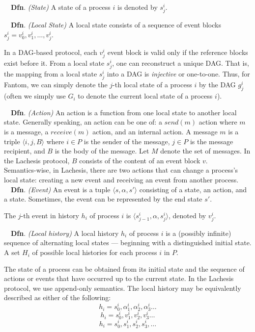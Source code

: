 \documentclass{article}
\newcommand{\dfnn}[2]{$\quad$\textbf{Dfn}. \emph{(#1)} {#2}}
\begin{document}
\dfnn{State}{A state of a process $i$ is denoted by $s_j^i$.}

\dfnn{Local State}{A local state consists of a sequence of event blocks $s_j^i = v_0^i, v_1^i, \dots, v_j^i$.}

 In a DAG-based protocol, each $v_j^i$ event block is valid only if the reference blocks exist before it. From a local state $s_j^i$, one can reconstruct a unique DAG. That is, the mapping from a local state  $s_j^i$ into a DAG is \emph{injective} or one-to-one. Thus, for Fantom, we can simply denote the $j$-th local state of a process $i$ by the DAG $g_j^i$ (often we simply use $G_i$ to denote the current local state of a process $i$).

\dfnn{Action}{An action is a function from one local state to another local state.}
 Generally speaking, an action can be one of: a $send(m)$ action where $m$ is a message, a $receive(m)$ action, and an internal action. A message $m$ is a triple $\langle i,j,B \rangle$ where $i \in P$ is the sender of the message, $j \in P$ is the message recipient, and $B$ is the body of the message. Let $M$ denote the set of messages. In the Lachesis protocol, $B$ consists of the content of an event block $v$.\\

Semantics-wise, in Lachesis, there are  two actions that can change a process's local state: creating a new event and receiving an event from another process.\\

\dfnn{Event}{An event is a tuple $\langle  s,\alpha,s' \rangle$ consisting of a state, an action, and a state. Sometimes, the event can be represented by the end state $s'$.}

The $j$-th event in history $h_i$ of process $i$ is $\langle  s_{j-1}^i,\alpha,s_j^i \rangle$, denoted by $v_j^i$.

\dfnn{Local history}{A local history $h_i$ of process $i$ is a (possibly infinite) sequence of alternating local states  --- beginning with a distinguished initial state. A set $H_i$ of possible local histories for each process $i$ in $P$.}

 The state of a process can be obtained from its initial state and the sequence of actions or events that have occurred up to the current state. In the Lachesis protocol, we use append-only semantics. The local history may be equivalently described as either of the following:
$$h_i = s_0^i,\alpha_1^i,\alpha_2^i, \alpha_3^i \dots $$
$$h_i = s_0^i, v_1^i,v_2^i, v_3^i \dots $$
$$h_i = s_0^i, s_1^i, s_2^i, s_3^i, \dots$$
\end{document}
